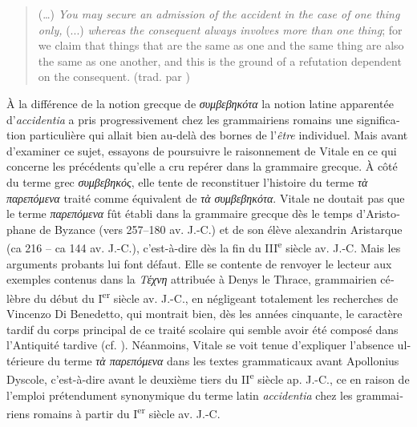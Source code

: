 \documentclass[french,output=paper,colorlinks,citecolor=brown]{../langscibook}
\begin{document}
\begin{otherlanguage}{french}
\begin{quote}
(…) \textit{You may secure an admission of the accident in the case of one thing only,} (...) \textit{whereas the consequent always involves more than one thing}; for we claim that things that are the same as one and the same thing are also the same as one another, and this is the ground of a refutation dependent on the consequent. (trad. par \citealt[285]{Barnes1984})

\end{quote}

À la différence de la notion grecque de \textit{συμβεβηκότα} la notion latine apparentée d’\textit{accidentia} a pris progressivement chez les grammairiens romains une signification particulière qui allait bien au-delà des bornes de l’\textit{être} individuel. Mais avant d’examiner ce sujet, essayons de poursuivre le raisonnement de Vitale en ce qui concerne les précédents qu’elle a cru repérer dans la grammaire grecque. À côté du terme grec \textit{συμβεβηκός}, elle tente de reconstituer l’histoire du terme \textit{τὰ παρεπόμενα} traité comme équivalent de \textit{τὰ συμβεβηκότα}. Vitale ne doutait pas que le terme \textit{παρεπόμενα} fût établi dans la grammaire grecque dès le temps d’Aristophane de Byzance (vers 257–180 av. J.-C.) et de son élève alexandrin Aristarque (ca 216 – ca 144 av. J.-C.), c’est-à-dire dès la fin du III\textsuperscript{e} siècle av. J.-C. Mais les arguments probants lui font défaut. Elle se contente de renvoyer le lecteur aux exemples contenus dans la \textit{Τέχνη} attribuée à Denys le Thrace, grammairien célèbre du début du I\textsuperscript{er} siècle av. J.-C., en négligeant totalement les recherches de Vincenzo Di Benedetto, qui montrait bien, dès les années cinquante, le caractère tardif du corps principal de ce traité scolaire qui semble avoir été composé dans l’Antiquité tardive (cf. \citealt{Di-Benedetto1958, Di-Benedetto1959}). Néanmoins, Vitale se voit tenue d’expliquer l’absence ultérieure du terme \textit{τὰ παρεπόμενα} dans les textes grammaticaux avant Apollonius Dyscole, c’est-à-dire avant le deuxième tiers du II\textsuperscript{e} siècle ap. J.-C., ce en raison de l’emploi prétendument synonymique du terme latin \textit{accidentia} chez les grammairiens romains à partir du I\textsuperscript{e}\textsuperscript{r} siècle av. J.-C.


\end{otherlanguage}
\end{document}
